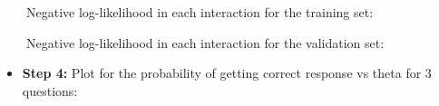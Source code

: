 \documentclass[letterpaper]{article}
\begin{document}
\ \ \ \ Negative log-likelihood in each interaction for the training set: 




\ \ \ \ Negative log-likelihood in each interaction for the validation set: 




\begin{itemize}[resume*=listWWNumii]
\item \textbf{Step 4:} Plot for the probability of getting correct response vs theta for 3 questions: 
\end{itemize}
\end{document}
